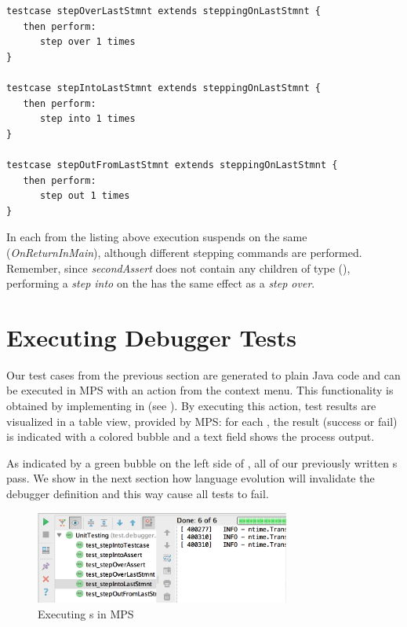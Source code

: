 \begin{lstlisting}[language=testingDSL,
caption=Test stepping commands on last \ic{Statemet} in \ic{Testcase}] 
testcase stepOverLastStmnt extends steppingOnLastStmnt { 
   then perform:                         
      step over 1 times                            
}

testcase stepIntoLastStmnt extends steppingOnLastStmnt {            
   then perform:                         
      step into 1 times                            
}

testcase stepOutFromLastStmnt extends steppingOnLastStmnt {            
   then perform:                         
      step out 1 times                            
}
\end{lstlisting}		

In each  from the listing above execution suspends on the
same  (\emph{OnReturnInMain}), although different stepping
commands are performed. Remember, since \emph{secondAssert} does not contain
any children of type  (\eg {}), performing a
\emph{step into} on the  has the same effect as
a \emph{step over}.

\section{Executing Debugger Tests}

Our test cases from the previous section are generated to plain Java code and
can be executed in \ac{MPS} with an action from the
context menu. This functionality is obtained by implementing  in
 (see ).
By executing this action, test results are visualized in a table view, provided
by \ac{MPS}: for each , the result (success or
fail) is indicated with a colored bubble and a text field shows the
process output.

As indicated by a green bubble on the left side of , all
of our previously written s pass. 
We show in the next section how language evolution will invalidate the debugger
definition and this way cause all tests to fail.

\begin{figure}[h]
	\vspace{-2mm}
	\centering
    \includegraphics[width=8.4cm]{./figures/debuggerTestExec.png} 
    \vspace{-3mm}
	\caption{Executing s in \ac{MPS}}
	\label{fig:TestExecution1}
	\vspace{-3mm}
\end{figure}